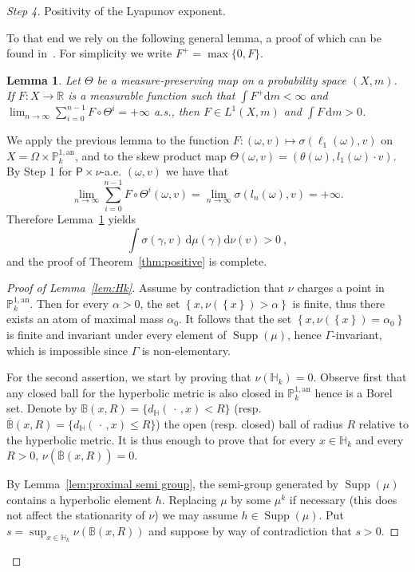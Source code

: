 \documentclass[11pt]{article}
\newtheorem{lemm}[theo]{Lemma}
\theoremstyle{definition}
\numberwithin{equation}{section}
\numberwithin{figure}{section}
\numberwithin{table}{section}
\DeclareMathOperator{\supp}{Supp}
\newcommand{\re}{\mathbb{R}}
\newcommand{\hh}{\mathbb{H}}
\newcommand{\prob}{\mathsf{P}}
\newcommand{\B}{\mathbb{B}}
\newcommand{\an}{\mathrm{an}}
\newcommand{\cv}{\rightarrow}
\newcommand{\om}{\Omega}
\newcommand{\set}[1]{\left\{#1\right\}}
\newcommand{\PP}{\mathbb{P}}
\newcommand{\berk}{{\mathbb{P}^{1, \mathrm{an}}_k}}
\newcommand*{\dd}{\mathrm{d}}
\newcommand*{\dm}{\dd m}
\newcommand*{\dmu}{\dd \mu}
\newcommand*{\dnu}{\dd \nu}
\newenvironment{step}{\begin{proof}}{\let\qed\relax \end{proof}}
\begin{document}
\begin{step}[Step 4]
Positivity of the Lyapunov exponent.

To that end we rely on the following general lemma, a proof of which can be found in~\cite[Lem.~2.3, p.~22]{bougerol-lacroix}. For simplicity we write $F^+ = \max \{ 0, F\}$.

\begin{lemm}\label{lem:birkhoff}
Let $\Theta$ be a measure-preserving map on a probability space $(X, m)$. If $F:X\to \re$ is a measurable function such that $\int F^+ \dm <\infty$ and $\lim_{n\cv\infty} \sum_{i=0}^{n-1} F\circ \Theta^i = +\infty $ a.s., then $F\in L^1(X,m)$ and $\int F \,\dm >0$.
\end{lemm}

We apply the previous lemma to the function $F: (\omega, v) \mapsto \sigma(\ell_1(\omega), v)$ on $X=\om\times \berk$, and to the skew product map $\Theta(\omega,v) = (\theta(\omega), l_1(\omega) \cdot v)$. By Step 1 for $\prob\times \nu$-a.e. $(\omega,v)$ we have that
\[
\lim_{n\cv\infty} \sum_{i=0}^{n-1} F\circ \Theta^i (\omega,v) = \lim_{n\cv\infty} \sigma(l_n(\omega),v) = +\infty.
\]
Therefore Lemma~\ref{lem:birkhoff} yields
\begin{equation}\label{eqL}
\int \sigma(\gamma, v)\, \dmu(\gamma)\dnu(v) >0~,
\end{equation}
and the proof of Theorem~\ref{thm:positive} is complete.

\begin{proof}[Proof of Lemma~\ref{lem:Hk}]
Assume by contradiction that $\nu$ charges a point in $\PP^{1,\an}_k$. Then for every $\alpha>0$, the set $\set{x, \nu(\set{x})>\alpha}$ is finite, thus there exists an atom of maximal mass $\alpha_0$. It follows that the set $\set {x, \nu(\set{x})=\alpha_0}$ is finite and invariant under every element of $\supp(\mu)$, hence $\Gamma$-invariant, which is impossible since $\Gamma$ is non-elementary.

For the second assertion, we start by proving that $\nu(\hh_k) =0$. Observe first that any closed ball for the hyperbolic metric is also closed in $\PP^{1,\an}_k$ hence is a Borel set. Denote by $\B(x,R) = \{ d_{\hh}({\,\cdot\,}, x) < R\}$ (resp. $\overline{\B}(x,R) = \{ d_{\hh}({\,\cdot\,}, x) \le R\}$) the open (resp. closed) ball of radius $R$ relative to the hyperbolic metric. It is thus enough to prove that for every $x\in \hh_k$ and every $R>0$, $\nu(\overline{\B}(x,R)) = 0$.

By Lemma~\ref{lem:proximal semi group}, the semi-group generated by $\supp(\mu)$ contains a hyperbolic element $h$. Replacing $\mu$ by some $\mu^k$ if necessary (this does not affect the stationarity of $\nu$) we may assume $h\in \supp(\mu)$. Put $s= \sup_{x\in \hh_k} \nu(\B(x,R))$ and suppose by way of contradiction that $s>0$.


\end{proof}
\end{step}
\end{document}
